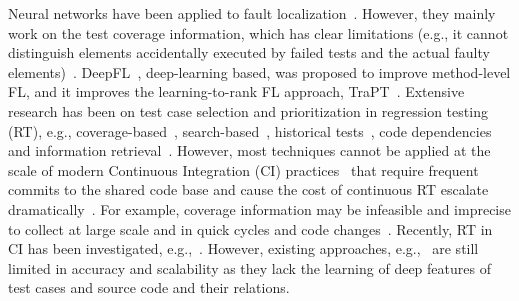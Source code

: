%
Neural networks have been applied to fault
localization~\cite{zheng2016fault, briand2007using, zhang2017deep,
  wong2009bp}. However, they mainly work on the test coverage
information, which has clear limitations (e.g., it cannot distinguish
elements accidentally executed by failed tests and the actual faulty
elements)~\cite{li2017transforming}. DeepFL~\cite{DeepFL},
deep-learning based, was proposed to improve method-level FL, and it
improves the learning-to-rank FL approach,
TraPT~\cite{TraPT}. Extensive research has been on test case selection and prioritization in regression testing (RT), e.g., coverage-based~\cite{di2015coverage}, search-based~\cite{de2011multi,yu2010time}, historical tests~\cite{kim2002history,marijan2013test,noor2015similarity,park2008historical}, code dependencies~\cite{gligoric2015ekstazi} and information retrieval~\cite{kwon2014test,saha2015information}. 
However, most techniques cannot be applied at the scale of modern Continuous Integration (CI) practices~\cite{elbaum2014techniques} that require frequent commits to the shared code base and cause the cost of continuous RT escalate dramatically~\cite{memon2017taming}. For example, coverage information may be infeasible and imprecise to collect at large scale and in quick cycles and code changes~\cite{elbaum2014techniques,haghighatkhah2018test,hemmati2015prioritizing,yu2018study}. 
Recently, RT in CI has been investigated, e.g.,~\cite{elbaum2014techniques,gligoric2015practical,yu2018study,jiang2009adaptive,henard2016comparing}. 
However, existing approaches, e.g.,~\cite{bertolino2020learning,spieker2017reinforcement} are still limited in accuracy and scalability as they lack the learning of deep features of test cases and source code and their relations. 


